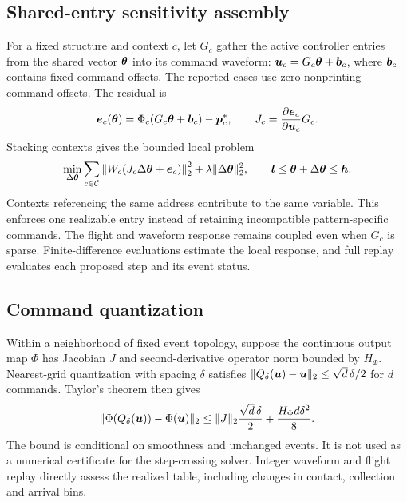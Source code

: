 \subsection{Shared-entry sensitivity assembly}
For a fixed structure and context $c$, let $G_c$ gather the active controller entries from the shared vector $\boldsymbol{\theta}$ into its command waveform: $\boldsymbol{u}_c=G_c\boldsymbol{\theta}+\boldsymbol{b}_c$, where $\boldsymbol{b}_c$ contains fixed command offsets. The reported cases use zero nonprinting command offsets. The residual is
\begin{equation}
 \boldsymbol{e}_c(\boldsymbol{\theta})=\Phi_c(G_c\boldsymbol{\theta}+\boldsymbol{b}_c)-\boldsymbol{p}_c^*,
 \qquad J_c=\frac{\partial\boldsymbol{e}_c}{\partial\boldsymbol{u}_c}G_c.
\end{equation}
Stacking contexts gives the bounded local problem
\begin{equation}
 \min_{\Delta\boldsymbol{\theta}}
 \sum_{c\in\mathcal C}\left\|W_c(J_c\Delta\boldsymbol{\theta}+\boldsymbol{e}_c)\right\|_2^2
 +\lambda\|\Delta\boldsymbol{\theta}\|_2^2,
 \qquad \boldsymbol{l}\leq\boldsymbol{\theta}+\Delta\boldsymbol{\theta}\leq\boldsymbol{h}.
\end{equation}
Contexts referencing the same address contribute to the same variable. This enforces one realizable entry instead of retaining incompatible pattern-specific commands. The flight and waveform response remains coupled even when $G_c$ is sparse. Finite-difference evaluations estimate the local response, and full replay evaluates each proposed step and its event status.

\subsection{Command quantization}
Within a neighborhood of fixed event topology, suppose the continuous output map $\Phi$ has Jacobian $J$ and second-derivative operator norm bounded by $H_\Phi$. Nearest-grid quantization with spacing $\delta$ satisfies $\|Q_\delta(\boldsymbol{u})-\boldsymbol{u}\|_2\leq\sqrt{d}\,\delta/2$ for $d$ commands. Taylor's theorem then gives
\begin{equation}
 \|\Phi(Q_\delta(\boldsymbol{u}))-\Phi(\boldsymbol{u})\|_2
 \leq\|J\|_2\frac{\sqrt d\,\delta}{2}
       +\frac{H_\Phi d\delta^2}{8}.
\end{equation}
The bound is conditional on smoothness and unchanged events. It is not used as a numerical certificate for the step-crossing solver. Integer waveform and flight replay directly assess the realized table, including changes in contact, collection and arrival bins.
